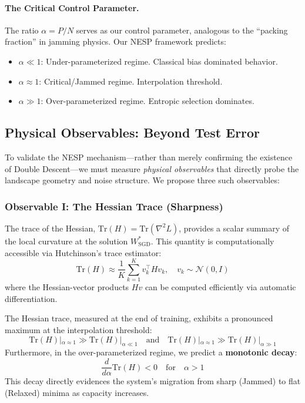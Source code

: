 \paragraph{The Critical Control Parameter.} The ratio $\alpha = P/N$ serves as our control parameter, analogous to the ``packing fraction'' in jamming physics. Our NESP framework predicts:
\begin{itemize}[topsep=1pt,itemsep=1pt]
    \item $\alpha \ll 1$: Under-parameterized regime. Classical bias dominated behavior.
    \item $\alpha \approx 1$: Critical/Jammed regime. Interpolation threshold.
    \item $\alpha \gg 1$: Over-parameterized regime. Entropic selection dominates.
\end{itemize}

\subsection{Physical Observables: Beyond Test Error}

To validate the NESP mechanism---rather than merely confirming the existence of Double Descent---we must measure \textit{physical observables} that directly probe the landscape geometry and noise structure. We propose three such observables:

\subsubsection{Observable I: The Hessian Trace (Sharpness)}

The trace of the Hessian, $\mathrm{Tr}(H) = \mathrm{Tr}(\nabla^2 L)$, provides a scalar summary of the local curvature at the solution $W^*_{\text{SGD}}$. This quantity is computationally accessible via Hutchinson's trace estimator:
\begin{equation}
    \mathrm{Tr}(H) \approx \frac{1}{K} \sum_{k=1}^K v_k^\top H v_k, \quad v_k \sim \mathcal{N}(0, I)
\end{equation}
where the Hessian-vector products $Hv$ can be computed efficiently via automatic differentiation.

\begin{hypothesis}
The Hessian trace, measured at the end of training, exhibits a pronounced maximum at the interpolation threshold:
\begin{equation}
    \mathrm{Tr}(H)|_{\alpha \approx 1} \gg \mathrm{Tr}(H)|_{\alpha \ll 1} \quad \text{and} \quad \mathrm{Tr}(H)|_{\alpha \approx 1} \gg \mathrm{Tr}(H)|_{\alpha \gg 1}
\end{equation}
Furthermore, in the over-parameterized regime, we predict a \textbf{monotonic decay}:
\begin{equation}
    \frac{d}{d\alpha} \mathrm{Tr}(H) < 0 \quad \text{for} \quad \alpha > 1
\end{equation}
This decay directly evidences the system's migration from sharp (Jammed) to flat (Relaxed) minima as capacity increases.
\end{hypothesis}

